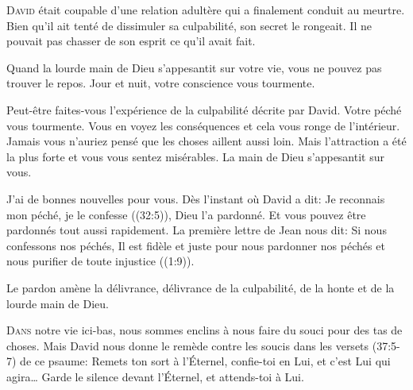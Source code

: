 
\lettrine{D}{avid} était coupable d'une relation adultère
 qui a finalement conduit au meurtre.
 Bien qu'il ait tenté de dissimuler sa culpabilité,
 son secret le rongeait.
 Il ne pouvait pas chasser de son esprit ce qu'il avait fait. 

Quand la lourde main de Dieu s'appesantit sur votre vie,
 vous ne pouvez pas trouver le repos.
 Jour et nuit, votre conscience vous tourmente. 


Peut-être faites-vous l'expérience de la culpabilité décrite par David.
 Votre péché vous tourmente.
 Vous en voyez les conséquences et cela vous ronge de l'intérieur.
 Jamais vous n'auriez pensé que les choses aillent aussi loin.
 Mais l'attraction a été la plus forte et vous vous sentez misérables.
 La main de Dieu s'appesantit sur vous. 

J'ai de bonnes nouvelles pour vous. Dès l'instant où David a dit:
 \Og Je reconnais mon péché, je le confesse \Fg{} ((32:5)),
 Dieu l'a pardonné.
 Et vous pouvez être pardonnés tout aussi rapidement.
 La première lettre de Jean nous dit:
 \Og Si nous confessons nos péchés, Il est fidèle et juste
 pour nous pardonner nos péchés et nous purifier de toute injustice \Fg{}
 ((1:9)).

Le pardon amène la délivrance, délivrance de la culpabilité,
 de la honte et de la lourde main de Dieu. 

\dvrule






\lettrine{D}{ans} notre vie ici-bas, nous sommes enclins
 à nous faire du souci pour des tas de choses.
 Mais David nous donne le remède contre les soucis dans
 les versets (37:5-7) de ce psaume:
 \Og Remets ton sort à l'Éternel, confie-toi en Lui,
 et c'est Lui qui agira\dots{}
 Garde le silence devant l'Éternel, et attends-toi à Lui. \Fg{}

